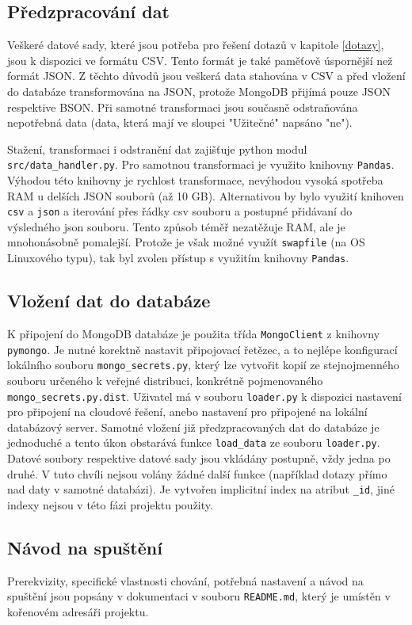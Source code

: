 \documentclass[12pt]{article}
\begin{document}
\subsection{Předzpracování dat}
\label{predzpracovani}
Veškeré datové sady, které jsou potřeba pro řešení dotazů v kapitole \ref{dotazy}, jsou k dispozici ve formátu CSV. Tento formát je také paměťově úspornější než formát JSON. Z těchto důvodů jsou veškerá data stahována v CSV a před vložení do databáze transformována na JSON, protože MongoDB přijímá pouze JSON respektive BSON. Při samotné transformaci jsou současně odstraňována nepotřebná data (data, která mají ve sloupci "Užitečné" napsáno "ne").

Stažení, transformaci i odstranění dat zajišťuje python modul \texttt{src/data\_handler.py}. Pro samotnou transformaci je využito knihovny \texttt{Pandas}. Výhodou této knihovny je rychlost transformace, nevýhodou vysoká spotřeba RAM u delších JSON souborů (až 10 GB). Alternativou by bylo využití knihoven \texttt{csv} a \texttt{json} a iterování přes řádky csv souboru a postupné přidávaní do výsledného json souboru. Tento způsob téměř nezatěžuje RAM, ale je mnohonásobně pomalejší. Protože je však možné využít \texttt{swapfile} (na OS Linuxového typu), tak byl zvolen přístup s využitím knihovny \texttt{Pandas}.

\subsection{Vložení dat do databáze}
K připojení do MongoDB databáze je použita třída \texttt{MongoClient} z knihovny \texttt{pymongo}. Je nutné korektně nastavit připojovací řetězec, a to nejlépe konfigurací lokálního souboru \texttt{mongo\_secrets.py}, který lze vytvořit kopií ze stejnojmenného souboru určeného k veřejné distribuci, konkrétně pojmenovaného \texttt{mongo\_secrets.py.dist}.
Uživatel má v souboru \texttt{loader.py} k dispozici nastavení pro připojení na cloudové řešení, anebo nastavení pro připojené na lokální databázový server.
Samotné vložení již předzpracovaných dat do databáze je jednoduché a tento úkon obstarává funkce \texttt{load\_data} ze souboru \texttt{loader.py}. 
Datové soubory respektive datové sady jsou vkládány postupně, vždy jedna po druhé. V tuto chvíli nejsou volány žádné další funkce (například dotazy přímo nad daty v samotné databázi).
Je vytvořen implicitní index na atribut \texttt{\_id}, jiné indexy nejsou v této fázi projektu použity.

\subsection{Návod na spuštění}
Prerekvizity, specifické vlastnosti chování, potřebná nastavení a návod na spuštění jsou popsány v dokumentaci v souboru \texttt{README.md}, který je umístěn v kořenovém adresáři projektu.


% 
%
\end{document}
